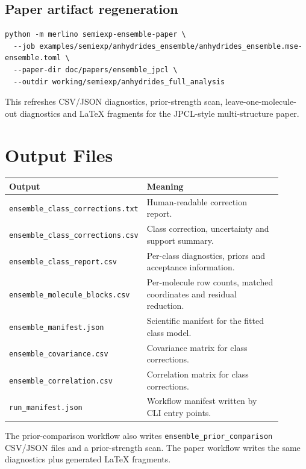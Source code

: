 \documentclass[11pt]{article}
\begin{document}
\subsection{Paper artifact regeneration}

\begin{lstlisting}[style=merlino]
python -m merlino semiexp-ensemble-paper \
  --job examples/semiexp/anhydrides_ensemble/anhydrides_ensemble.mse-ensemble.toml \
  --paper-dir doc/papers/ensemble_jpcl \
  --outdir working/semiexp/anhydrides_full_analysis
\end{lstlisting}

\noindent
This refreshes CSV/JSON diagnostics, prior-strength scan, leave-one-molecule-out
diagnostics and LaTeX fragments for the JPCL-style multi-structure paper.

\section{Output Files}

\begin{longtable}{@{}p{0.40\linewidth}p{0.50\linewidth}@{}}
\toprule
Output & Meaning \\
\midrule
\endhead
\texttt{ensemble\_class\_corrections.txt} & Human-readable correction report. \\
\texttt{ensemble\_class\_corrections.csv} & Class correction, uncertainty and
support summary. \\
\texttt{ensemble\_class\_report.csv} & Per-class diagnostics, priors and
acceptance information. \\
\texttt{ensemble\_molecule\_blocks.csv} & Per-molecule row counts, matched
coordinates and residual reduction. \\
\texttt{ensemble\_manifest.json} & Scientific manifest for the fitted class
model. \\
\texttt{ensemble\_covariance.csv} & Covariance matrix for class corrections. \\
\texttt{ensemble\_correlation.csv} & Correlation matrix for class corrections. \\
\texttt{run\_manifest.json} & Workflow manifest written by CLI entry points. \\
\bottomrule
\end{longtable}

The prior-comparison workflow also writes \texttt{ensemble\_prior\_comparison}
CSV/JSON files and a prior-strength scan.  The paper workflow writes the same
diagnostics plus generated LaTeX fragments.
\end{document}
